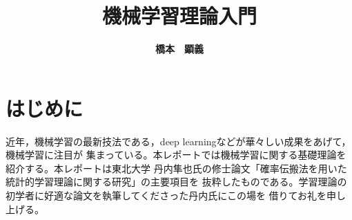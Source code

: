 \documentclass[12pt]{jreport}
\title{\bf{機械学習理論入門}}
\date{\hfill}
\author{\bf{橋本　顕義}}
\theoremstyle{break}
\begin{document}
\maketitle
\tableofcontents

\chapter*{はじめに}
近年，機械学習の最新技法である，deep learningなどが華々しい成果をあげて，機械学習に注目が
集まっている。本レポートでは機械学習に関する基礎理論を紹介する。本レポートは東北大学
丹内隼也氏の修士論文「確率伝搬法を用いた統計的学習理論に関する研究」の主要項目を
抜粋したものである。学習理論の初学者に好適な論文を執筆してくださった丹内氏にこの場を
借りてお礼を申し上げる。





\end{document}
